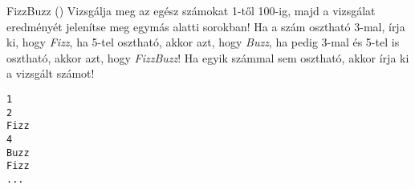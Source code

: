 \documentclass[usenames,dvipsnames,aspectratio=169]{beamer}
\begin{document}
\begin{frame}[fragile]
    \begin{exampleblock}{FizzBuzz ()}
        Vizsgálja meg az egész számokat 1-től 100-ig, majd a vizsgálat eredményét jelenítse meg egymás alatti sorokban! Ha a szám osztható 3-mal, írja ki, hogy \emph{Fizz}, ha 5-tel osztható, akkor azt, hogy \emph{Buzz}, ha pedig 3-mal és 5-tel is osztható, akkor azt, hogy \emph{FizzBuzz}! Ha egyik számmal sem osztható, akkor írja ki a vizsgált számot!\\
        \begin{verbatim}
1
2
Fizz
4
Buzz
Fizz
...
\end{verbatim}
    \end{exampleblock}
\end{frame}
\end{document}
